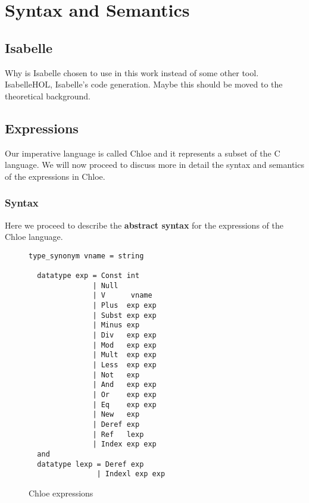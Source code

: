 \chapter{Syntax and Semantics}\label{chapter:semantics}

\section{Isabelle}\label{section:isabelle}

Why is Isabelle chosen to use in this work instead of some other tool.
IsabelleHOL, Isabelle's code generation.
Maybe this should be moved to the theoretical background.

\section{Expressions}\label{section:expressions}

Our imperative language is called Chloe and it represents a subset of the C language.
We will now proceed to discuss more in detail the syntax and semantics of the expressions in Chloe.

\subsection{Syntax}\label{subsection:syntax_expressions}

Here we proceed to describe the \textbf{abstract syntax} for the expressions of the Chloe language.

\begin{figure}
  \begin{lstlisting}[frame=single]
  type_synonym vname = string

  datatype exp = Const int
               | Null
               | V      vname
               | Plus  exp exp
               | Subst exp exp
               | Minus exp
               | Div   exp exp
               | Mod   exp exp
               | Mult  exp exp
               | Less  exp exp
               | Not   exp
               | And   exp exp
               | Or    exp exp
               | Eq    exp exp
               | New   exp
               | Deref exp
               | Ref   lexp
               | Index exp exp
  and
  datatype lexp = Deref exp
                | Indexl exp exp
  \end{lstlisting}

  \caption{Chloe expressions}
  \label{fig:chloe_expressions}
\end{figure}

